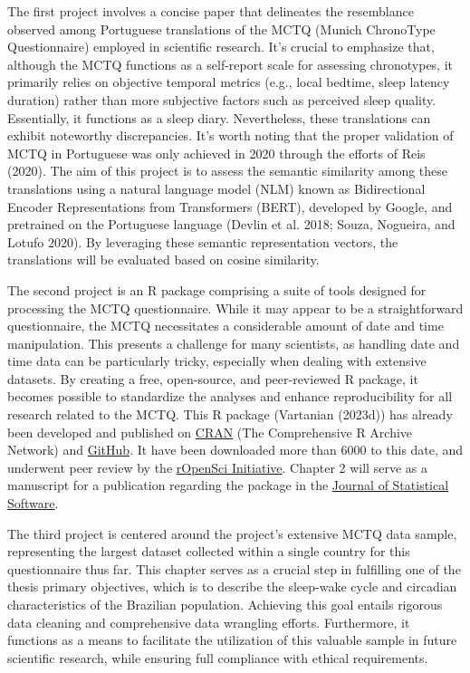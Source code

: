 \documentclass[
  12pt,
  a4paper,
  oneside]{tesesusp}
\begin{document}
The first project involves a concise paper that delineates the
resemblance observed among Portuguese translations of the MCTQ (Munich
ChronoType Questionnaire) employed in scientific research. It's crucial
to emphasize that, although the MCTQ functions as a self-report scale
for assessing chronotypes, it primarily relies on objective temporal
metrics (e.g., local bedtime, sleep latency duration) rather than more
subjective factors such as perceived sleep quality. Essentially, it
functions as a sleep diary. Nevertheless, these translations can exhibit
noteworthy discrepancies. It's worth noting that the proper validation
of MCTQ in Portuguese was only achieved in 2020 through the efforts of
Reis (2020). The aim of this project is to assess the semantic
similarity among these translations using a natural language model (NLM)
known as Bidirectional Encoder Representations from Transformers (BERT),
developed by Google, and pretrained on the Portuguese language (Devlin
et al. 2018; Souza, Nogueira, and Lotufo 2020). By leveraging these
semantic representation vectors, the translations will be evaluated
based on cosine similarity.

The second project is an R package comprising a suite of tools designed
for processing the MCTQ questionnaire. While it may appear to be a
straightforward questionnaire, the MCTQ necessitates a considerable
amount of date and time manipulation. This presents a challenge for many
scientists, as handling date and time data can be particularly tricky,
especially when dealing with extensive datasets. By creating a free,
open-source, and peer-reviewed R package, it becomes possible to
standardize the analyses and enhance reproducibility for all research
related to the MCTQ. This R package (Vartanian (2023d)) has already been
developed and published on
\href{https://cran.r-project.org/web/packages/mctq/index.html}{CRAN}
(The Comprehensive R Archive Network) and
\href{https://github.com/ropensci/mctq}{GitHub}. It have been downloaded
more than 6000 to this date, and underwent peer review by the
\href{https://ropensci.org/}{rOpenSci Initiative}. Chapter 2 will serve
as a manuscript for a publication regarding the package in the
\href{https://www.jstatsoft.org/authors}{Journal of Statistical
Software}.

The third project is centered around the project's extensive MCTQ data
sample, representing the largest dataset collected within a single
country for this questionnaire thus far. This chapter serves as a
crucial step in fulfilling one of the thesis primary objectives, which
is to describe the sleep-wake cycle and circadian characteristics of the
Brazilian population. Achieving this goal entails rigorous data cleaning
and comprehensive data wrangling efforts. Furthermore, it functions as a
means to facilitate the utilization of this valuable sample in future
scientific research, while ensuring full compliance with ethical
requirements.
\end{document}
